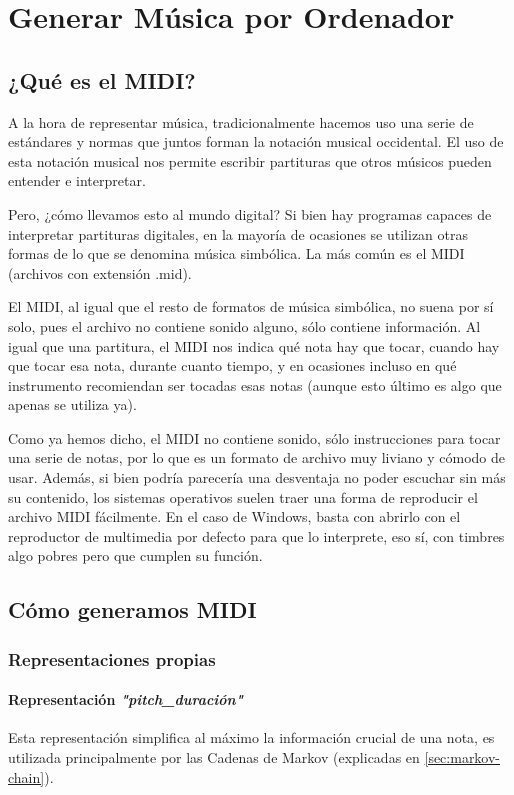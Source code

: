 \chapter{Generar Música por Ordenador}
\label{cap:generacionMusical}

\section{¿Qué es el MIDI?}
\label{subsec:que-es-midi}
A la hora de representar música, tradicionalmente hacemos uso una serie de estándares y normas que juntos forman la notación musical occidental. El uso de esta notación musical nos permite escribir partituras que otros músicos pueden entender e interpretar.

Pero, ¿cómo llevamos esto al mundo digital? Si bien hay programas capaces de interpretar partituras digitales, en la mayoría de ocasiones se utilizan otras formas de lo que se denomina música simbólica. La más común es el MIDI (archivos con extensión .mid).

El MIDI, al igual que el resto de formatos de música simbólica, no suena por sí solo, pues el archivo no contiene sonido alguno, sólo contiene información. Al igual que una partitura, el MIDI nos indica qué nota hay que tocar, cuando hay que tocar esa nota, durante cuanto tiempo, y en ocasiones incluso en qué instrumento recomiendan ser tocadas esas notas (aunque esto último es algo que apenas se utiliza ya).

Como ya hemos dicho, el MIDI no contiene sonido, sólo instrucciones para tocar una serie de notas, por lo que es un formato de archivo muy liviano y cómodo de usar. Además, si bien podría parecería una desventaja no poder escuchar sin más su contenido, los sistemas operativos suelen traer una forma de reproducir el archivo MIDI fácilmente. En el caso de Windows, basta con abrirlo con el reproductor de multimedia por defecto para que lo interprete, eso sí, con timbres algo pobres pero que cumplen su función.


\section{Cómo generamos MIDI}
\label{sec:como-generamos-melodias}
    \subsection{Representaciones propias}
        \subsubsection{Representación \textit{"pitch\_duración"}}
        \label{subsub:representacion-pitch_duracion}
        Esta representación simplifica al máximo la información crucial de una nota, es utilizada principalmente por las Cadenas de Markov (explicadas en \ref{sec:markov-chain}).

